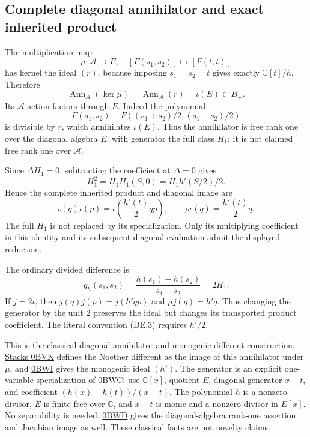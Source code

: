 \subsection{Complete diagonal annihilator and exact inherited product}

The multiplication map
\[
 \mu:\mathcal A\to E,\quad[F(s_1,s_2)]\mapsto[F(t,t)]
\]
has kernel the ideal \((r)\), because imposing \(s_1=s_2=t\) gives exactly \(\mathbb C[t]/h\). Therefore
\[
 \operatorname{Ann}_{\mathcal A}(\ker\mu)
 =\operatorname{Ann}_{\mathcal A}(r)=\iota(E)\subset B_+.
 \tag{DE.16}
\]
Its \(\mathcal A\)-action factors through \(E\). Indeed the polynomial
\[
 F(s_1,s_2)-F((s_1+s_2)/2,(s_1+s_2)/2)
\]
is divisible by \(r\), which annihilates \(\iota(E)\). Thus the annihilator is free rank one over the diagonal algebra \(E\), with generator the full class \(H_1\); it is not claimed free rank one over \(\mathcal A\).

Since \(\Delta H_1=0\), subtracting the coefficient at \(\Delta=0\) gives
\[
 H_1^2=H_1H_1(S,0)=H_1h'(S/2)/2.
\]
Hence the complete inherited product and diagonal image are
\[
 \boxed{\ \iota(q)\iota(p)=\iota\!\left(\frac{h'(t)}2qp\right),
 \qquad \rho\iota(q)=\frac{h'(t)}2q.\ }
 \tag{DE.17}
\]
The full \(H_1\) is not replaced by its specialization. Only its multiplying coefficient in this identity and its subsequent diagonal evaluation admit the displayed reduction.

The ordinary divided difference is
\[
 g_h(s_1,s_2)=\frac{h(s_1)-h(s_2)}{s_1-s_2}=2H_1.
\]
If \(j=2\iota\), then \(j(q)j(p)=j(h'qp)\) and \(\mu j(q)=h'q\). Thus changing the generator by the unit \(2\) preserves the ideal but changes its transported product coefficient. The literal convention (DE.3) requires \(h'/2\).

This is the classical diagonal-annihilator and monogenic-different construction. \href{https://stacks.math.columbia.edu/tag/0BVK}{Stacks 0BVK} defines the Noether different as the image of this annihilator under \(\mu\), and \href{https://stacks.math.columbia.edu/tag/0BWI}{0BWI} gives the monogenic ideal \((h')\). The generator is an explicit one-variable specialization of \href{https://stacks.math.columbia.edu/tag/0BWC}{0BWC}: use \(\mathbb C[x]\), quotient \(E\), diagonal generator \(x-t\), and coefficient \((h(x)-h(t))/(x-t)\). The polynomial \(h\) is a nonzero divisor, \(E\) is finite free over \(\mathbb C\), and \(x-t\) is monic and a nonzero divisor in \(E[x]\). No separability is needed. \href{https://stacks.math.columbia.edu/tag/0BWD}{0BWD} gives the diagonal-algebra rank-one assertion and Jacobian image as well. These classical facts are not novelty claims.

